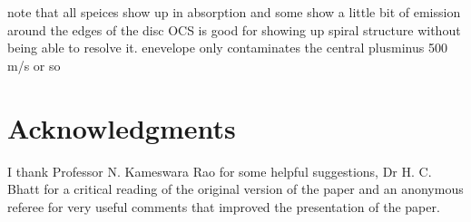 \documentclass[useAMS,usenatbib]{mn2e}
\begin{document}
note that all speices show up in absorption and some show a little bit of emission around the edges of the disc
OCS is good for showing up spiral structure without being able to resolve it.
enevelope only contaminates the central plusminus 500 m/s or so


\section*{Acknowledgments}

I thank Professor N. Kameswara Rao for some helpful suggestions,
Dr H. C. Bhatt for a critical reading of the original version of the
paper and an anonymous referee for very useful comments that improved
the presentation of the paper.


%
%
%
%
\end{document}
